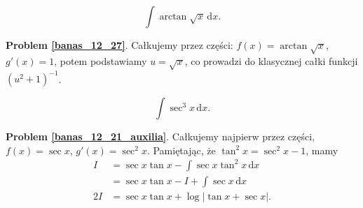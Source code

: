 \begin{problem_with_solution}
    \label{banas_12_27}%
    \begin{equation}
        \int \arctan \sqrt{x} \,\mathrm{d}x.
    \end{equation}
\end{problem_with_solution}

\textbf{Problem \ref{banas_12_27}}.
Całkujemy przez części: $f(x) = \arctan \sqrt x$, $g'(x) = 1$, potem podstawiamy $u = \sqrt{x}$, co prowadzi do klasycznej całki funkcji $(u^2 + 1)^{-1}$.

\begin{problem_with_solution}
    \label{banas_12_21_auxilia}%
    \begin{equation}
        \int \sec^3 x \,\mathrm{d}x.
    \end{equation}
\end{problem_with_solution}

\textbf{Problem \ref{banas_12_21_auxilia}}.
Całkujemy najpierw przez części, $f(x) = \sec x$, $g'(x) = \sec^2 x$.
Pamiętając, że $\tan^2 x = \sec^2 x - 1$, mamy
\begin{align}
    I & = \sec x \tan x - \int \sec x \tan^2 x \,\mathrm{d} x \\
        & = \sec x \tan x - I + \int \sec x \,\mathrm{d}x \\
    2I & = \sec x \tan x + \log |\tan x + \sec x|.
\end{align}
